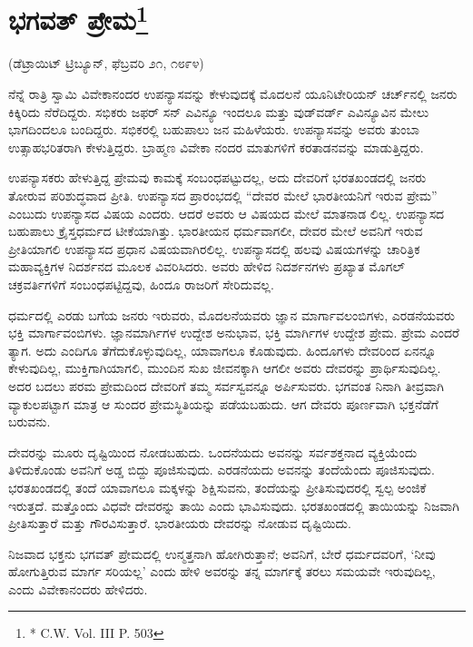 \delimiter


\section[ಭಗವತ್ ಪ್ರೇಮ]{ಭಗವತ್ ಪ್ರೇಮ\protect\footnote{* C.W. Vol. III P. 503}}

\begin{center}
(ಡೆಟ್ರಾಯಿಟ್​ ಟ್ರಿಬ್ಯೂನ್​, ಫೆಬ್ರವರಿ ೨೧, ೧೮೯೪)
\end{center}

ನೆನ್ನೆ ರಾತ್ರಿ ಸ್ವಾಮಿ ವಿವೇಕಾನಂದರ ಉಪನ್ಯಾಸವನ್ನು ಕೇಳುವುದಕ್ಕೆ ಮೊದಲನೆ ಯೂನಿಟೇರಿಯನ್​ ಚರ್ಚ್​ನಲ್ಲಿ ಜನರು ಕಿಕ್ಕಿರಿದು ನೆರೆದಿದ್ದರು. ಸಭಿಕರು ಜಫರ್​ ಸನ್​ ಎವಿನ್ಯೂ ಇಂದಲೂ ಮತ್ತು ವುಡ್​ವರ್ಡ್​ ಎವಿನ್ಯೂವಿನ ಮೇಲು ಭಾಗದಿಂದಲೂ ಬಂದಿದ್ದರು. ಸಭಿಕರಲ್ಲಿ ಬಹುಪಾಲು ಜನ ಮಹಿಳೆಯರು. ಉಪನ್ಯಾಸವನ್ನು ಅವರು ತುಂಬಾ ಉತ್ಸಾಹಭರಿತರಾಗಿ ಕೇಳುತ್ತಿದ್ದರು. ಬ್ರಾಹ್ಮಣ ವಿವೇಕಾ ನಂದರ ಮಾತುಗಳಿಗೆ ಕರತಾಡನವನ್ನು ಮಾಡುತ್ತಿದ್ದರು.

ಉಪನ್ಯಾಸಕರು ಹೇಳುತ್ತಿದ್ದ ಪ್ರೇಮವು ಕಾಮಕ್ಕೆ ಸಂಬಂಧಪಟ್ಟುದಲ್ಲ, ಅದು ದೇವರಿಗೆ ಭರತಖಂಡದಲ್ಲಿ ಜನರು ತೋರುವ ಪರಿಶುದ್ಧವಾದ ಪ್ರೀತಿ. ಉಪನ್ಯಾಸದ ಪ್ರಾರಂಭದಲ್ಲಿ “ದೇವರ ಮೇಲೆ ಭಾರತೀಯನಿಗೆ ಇರುವ ಪ್ರೇಮ” ಎಂಬುದು ಉಪನ್ಯಾಸದ ವಿಷಯ ಎಂದರು. ಆದರೆ ಅವರು ಆ ವಿಷಯದ ಮೇಲೆ ಮಾತನಾಡ ಲಿಲ್ಲ. ಉಪನ್ಯಾಸದ ಬಹುಪಾಲು ಕ್ರೈಸ್ತಧರ್ಮದ ಟೀಕೆಯಾಗಿತ್ತು. ಭಾರತೀಯನ ಧರ್ಮವಾಗಲೀ, ದೇವರ ಮೇಲೆ ಅವನಿಗೆ ಇರುವ ಪ್ರೀತಿಯಾಗಲಿ ಉಪನ್ಯಾಸದ ಪ್ರಧಾನ ವಿಷಯವಾಗಿರಲಿಲ್ಲ. ಉಪನ್ಯಾಸದಲ್ಲಿ ಹಲವು ವಿಷಯಗಳನ್ನು ಚಾರಿತ್ರಿಕ ಮಹಾವ್ಯಕ್ತಿಗಳ ನಿದರ್ಶನದ ಮೂಲಕ ವಿವರಿಸಿದರು. ಅವರು ಹೇಳಿದ ನಿದರ್ಶನಗಳು ಪ್ರಖ್ಯಾತ ಮೊಗಲ್​ ಚಕ್ರವರ್ತಿಗಳಿಗೆ ಸಂಬಂಧಪಟ್ಟಿದ್ದವು, ಹಿಂದೂ ರಾಜರಿಗೆ ಸೇರಿದುವಲ್ಲ.

ಧರ್ಮದಲ್ಲಿ ಎರಡು ಬಗೆಯ ಜನರು ಇರುವರು, ಮೊದಲನೆಯವರು ಜ್ಞಾನ ಮಾರ್ಗಾವಲಂಬಿಗಳು, ಎರಡನೆಯವರು ಭಕ್ತಿ ಮಾರ್ಗಾವಂಬಿಗಳು. ಜ್ಞಾನಮಾರ್ಗಿಗಳ ಉದ್ದೇಶ ಅನುಭಾವ, ಭಕ್ತಿ ಮಾರ್ಗಿಗಳ ಉದ್ದೇಶ ಪ್ರೇಮ. ಪ್ರೇಮ ಎಂದರೆ ತ್ಯಾಗ. ಅದು ಎಂದಿಗೂ ತೆಗೆದುಕೊಳ್ಳುವುದಿಲ್ಲ, ಯಾವಾಗಲೂ ಕೊಡುವುದು. ಹಿಂದೂಗಳು ದೇವರಿಂದ ಏನನ್ನೂ ಕೇಳುವುದಿಲ್ಲ, ಮುಕ್ತಿಗಾಗಿಯಾಗಲಿ, ಮುಂದಿನ ಸುಖ ಜೀವನಕ್ಕಾಗಿ ಆಗಲೀ ಅವರು ದೇವರನ್ನು ಪ್ರಾರ್ಥಿಸುವುದಿಲ್ಲ. ಅದರ ಬದಲು ಪರಮ ಪ್ರೇಮದಿಂದ ದೇವರಿಗೆ ತಮ್ಮ ಸರ್ವಸ್ವವನ್ನೂ ಅರ್ಪಿಸುವರು. ಭಗವಂತ ನಿನಾಗಿ ತೀವ್ರವಾಗಿ ವ್ಯಾಕುಲಪಟ್ಟಾಗ ಮಾತ್ರ ಆ ಸುಂದರ ಪ್ರೇಮಸ್ಥಿತಿಯನ್ನು ಪಡೆಯಬಹುದು. ಆಗ ದೇವರು ಪೂರ್ಣವಾಗಿ ಭಕ್ತನೆಡೆಗೆ ಬರುವನು.

ದೇವರನ್ನು ಮೂರು ದೃಷ್ಟಿಯಿಂದ ನೋಡಬಹುದು. ಒಂದನೆಯದು ಅವನನ್ನು ಸರ್ವಶಕ್ತನಾದ ವ್ಯಕ್ತಿಯೆಂದು ತಿಳಿದುಕೊಂಡು ಅವನಿಗೆ ಅಡ್ಡ ಬಿದ್ದು ಪೂಜಿಸುವುದು. ಎರಡನೆಯದು ಅವನನ್ನು ತಂದೆಯೆಂದು ಪೂಜಿಸುವುದು. ಭರತಖಂಡದಲ್ಲಿ ತಂದೆ ಯಾವಾಗಲೂ ಮಕ್ಕಳನ್ನು ಶಿಕ್ಷಿಸುವನು, ತಂದೆಯನ್ನು ಪ್ರೀತಿಸುವುದರಲ್ಲಿ ಸ್ವಲ್ಪ ಅಂಜಿಕೆ ಇರುತ್ತದೆ. ಮತ್ತೊಂದು ವಿಧವೇ ದೇವರನ್ನು ತಾಯಿ ಎಂದು ಭಾವಿಸುವುದು. ಭರತಖಂಡದಲ್ಲಿ ತಾಯಿಯನ್ನು ನಿಜವಾಗಿ ಪ್ರೀತಿಸುತ್ತಾರೆ ಮತ್ತು ಗೌರವಿಸುತ್ತಾರೆ. ಭಾರತೀಯರು ದೇವರನ್ನು ನೋಡುವ ದೃಷ್ಟಿಯಿದು.

ನಿಜವಾದ ಭಕ್ತನು ಭಗವತ್​ ಪ್ರೇಮದಲ್ಲಿ ಉನ್ಮತ್ತನಾಗಿ ಹೋಗಿರುತ್ತಾನೆ; ಅವನಿಗೆ, ಬೇರೆ ಧರ್ಮದವರಿಗೆ, ‘ನೀವು ಹೋಗುತ್ತಿರುವ ಮಾರ್ಗ ಸರಿಯಲ್ಲ’ ಎಂದು ಹೇಳಿ ಅವರನ್ನು ತನ್ನ ಮಾರ್ಗಕ್ಕೆ ತರಲು ಸಮಯವೇ ಇರುವುದಿಲ್ಲ, ಎಂದು ವಿವೇಕಾನಂದರು ಹೇಳಿದರು.

